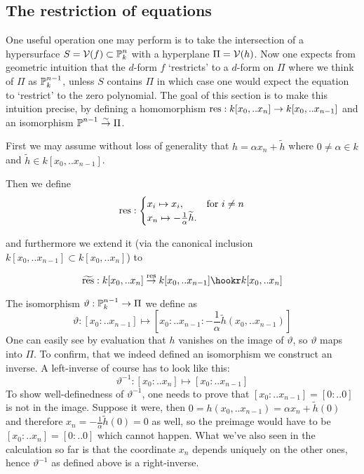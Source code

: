 \subsection{The restriction of equations}

One useful operation one may perform is to take the intersection of a hypersurface $S = \operatorname{\mathcal V}(f) \subset \operatorname{\mathbb P}^n_k$ with a hyperplane $\Pi = \operatorname{\mathcal V}(h)$.
Now one expects from geometric intuition that the $d$-form $f$ `restricts' to a $d$-form on $\Pi$ where we think of $\Pi$ as $\operatorname{\mathbb P}^{n-1}_k$, unless $S$ contains $\Pi$ in which case one would expect the equation to `restrict' to the zero polynomial.
The goal of this section is to make this intuition precise, by defining a homomorphism ${\operatorname{res}} : k[x_0,..x_n] \to k[x_0,..x_{n-1}]$ and an isomorphism $\operatorname{\mathbb P}^{n-1} \overset\sim\to \Pi$.

First we may assume without loss of generality that
$h = \alpha x_n + \widetilde h$ where $0 \neq \alpha \in k$ and $\widetilde h \in k[x_0,..x_{n-1}]$.

Then we define
\begin{equation}
{\operatorname{res}} : \begin{cases}
x_i \mapsto x_i, & \text{for } i \neq n \\
x_n \mapsto -\frac 1\alpha \widetilde h. &
\end{cases}
\end{equation}

and furthermore we extend it (via the canonical inclusion $k[x_0,..x_{n-1}] \subset k[x_0,..x_n]$) to

\begin{equation}
\widetilde{\var{res}} : k[x_0,.. x_n] \overset{\var{res}}\to k[x_0,.. x_{n-1}] \hookr k[x_0,.. x_n]
\end{equation}

The isomorphism $\vartheta : \operatorname{\mathbb P}^{n-1}_k \to \Pi$ we define as
\begin{equation}
\vartheta : [x_0:..x_{n-1}] \mapsto [x_0:..x_{n-1}:-\frac 1\alpha \widetilde h(x_0,..x_{n-1})]
\end{equation}
One can easily see by evaluation that $h$ vanishes on the image of $\vartheta$, so $\vartheta$ maps into $\Pi$. To confirm, that we indeed defined an isomorphism we construct an inverse.
A left-inverse of course has to look like this:
\begin{equation}
\vartheta^{-1} : [x_0:..x_n] \mapsto [x_0:..x_{n-1}]
\end{equation}
To show well-definedness of $\vartheta^{-1}$, one needs to prove that $[x_0:..x_{n-1}] = [0:..0]$ is not in the image. Suppose it were, then $0 = h(x_0,..x_{n-1}) = \alpha x_n + \widetilde h(0)$ and therefore $x_n = -\frac 1\alpha \widetilde h(0) = 0$ as well, so the preimage would have to be $[x_0:..x_n] = [0:..0]$ which cannot happen.
What we've also seen in the calculation so far is that the coordinate $x_n$ depends uniquely on the other ones, hence $\vartheta^{-1}$ as defined above is a right-inverse.

